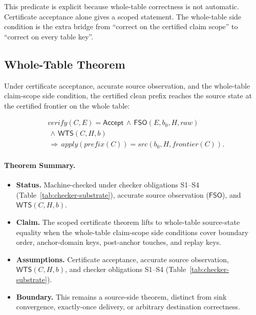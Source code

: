 \documentclass[letterpaper,10pt,twocolumn]{article}
\newcommand{\Apply}{\mathit{apply}}
\newcommand{\Src}{\mathit{src}}
\newcommand{\Frontier}{\mathit{frontier}}
\newcommand{\CleanPrefix}{\mathit{prefix}}
\newcommand{\Verify}{\mathit{verify}}
\newcommand{\RawObs}{\mathit{raw}}
\newcommand{\FSO}{\mathsf{FSO}}
\newcommand{\WTS}{\mathsf{WTS}}
\newcommand{\Accept}{\mathsf{Accept}}
\providecommand{\tightlist}{\setlength{\itemsep}{0pt}\setlength{\parskip}{0pt}}
\begin{document}
\begin{figure}[t]
  
\end{figure}

This predicate is explicit because whole-table correctness is not
automatic. Certificate acceptance alone gives a scoped statement. The
whole-table side condition is the extra bridge from ``correct on the
certified claim scope'' to ``correct on every table key''.

\subsection{Whole-Table Theorem}\label{whole-table-theorem}

Under certificate acceptance, accurate source observation, and the
whole-table claim-scope side condition, the certified clean prefix
reaches the source state at the certified frontier on the whole table:

\[
\begin{aligned}
&\Verify(C,E)=\Accept \,\land\, \FSO(E,b_0,H,\RawObs)\\
&\,\land\, \WTS(C,H,b)\\
&\,\Longrightarrow\, \Apply(\CleanPrefix(C))=\Src(b_0,H,\Frontier(C)).
\end{aligned}
\]

\paragraph*{Theorem Summary.}
\begin{itemize}
\tightlist
\item
  \textbf{Status.} Machine-checked under
  checker obligations S1--S4
  (Table~\ref{tab:checker-substrate}), accurate source observation ($\FSO$),
  and $\WTS(C,H,b)$.
\item
  \textbf{Claim.} The scoped certificate theorem lifts to whole-table
  source-state equality when the whole-table claim-scope side conditions
  cover boundary order, anchor-domain keys, post-anchor touches, and
  replay keys.
\item
  \textbf{Assumptions.} Certificate acceptance, accurate source
  observation, $\WTS(C,H,b)$, and checker obligations
  S1--S4 (Table~\ref{tab:checker-substrate}).
\item
  \textbf{Boundary.} This remains a source-side theorem, distinct from sink
  convergence, exactly-once delivery, or arbitrary destination
  correctness.
\end{itemize}
\end{document}
